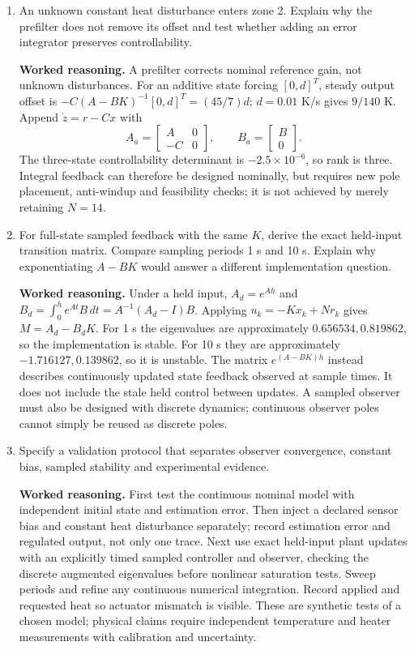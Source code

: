 \documentclass[10pt,a4paper]{article}
\newcommand{\answer}{\par\smallskip\textbf{Worked reasoning.} }
\begin{document}
\begin{enumerate}
\[\]
The poles are the union of feedback and observer poles. The observer must receive the applied actuator input. If it instead uses requested $u_*$ while the plant receives $u$, its error equation gains $B(u-u_*)$. Even with the correct input and homogeneous error dynamics, saturation makes the overall controller nonlinear; the linear separation principle does not prove global constrained performance.
\item An unknown constant heat disturbance enters zone 2. Explain why the prefilter does not remove its offset and test whether adding an error integrator preserves controllability.
\answer A prefilter corrects nominal reference gain, not unknown disturbances. For an additive state forcing $[0,d]^T$, steady output offset is $-C(A-BK)^{-1}[0,d]^T=(45/7)d$; $d=0.01$ K/s gives $9/140$ K. Append $\dot z=r-Cx$ with
\[
A_a=\begin{bmatrix}A&0\\-C&0\end{bmatrix},\qquad B_a=\begin{bmatrix}B\\0\end{bmatrix}.
\]
The three-state controllability determinant is $-2.5\times10^{-6}$, so rank is three. Integral feedback can therefore be designed nominally, but requires new pole placement, anti-windup and feasibility checks; it is not achieved by merely retaining $N=14$.
\item For full-state sampled feedback with the same $K$, derive the exact held-input transition matrix. Compare sampling periods 1 s and 10 s. Explain why exponentiating $A-BK$ would answer a different implementation question.
\answer Under a held input, $A_d=e^{Ah}$ and $B_d=\int_0^h e^{At}B\,dt=A^{-1}(A_d-I)B$. Applying $u_k=-Kx_k+Nr_k$ gives $M=A_d-B_dK$. For 1 s the eigenvalues are approximately $0.656534,0.819862$, so the implementation is stable. For 10 s they are approximately $-1.716127,0.139862$, so it is unstable. The matrix $e^{(A-BK)h}$ instead describes continuously updated state feedback observed at sample times. It does not include the stale held control between updates. A sampled observer must also be designed with discrete dynamics; continuous observer poles cannot simply be reused as discrete poles.
\item Specify a validation protocol that separates observer convergence, constant bias, sampled stability and experimental evidence.
\answer First test the continuous nominal model with independent initial state and estimation error. Then inject a declared sensor bias and constant heat disturbance separately; record estimation error and regulated output, not only one trace. Next use exact held-input plant updates with an explicitly timed sampled controller and observer, checking the discrete augmented eigenvalues before nonlinear saturation tests. Sweep periods and refine any continuous numerical integration. Record applied and requested heat so actuator mismatch is visible. These are synthetic tests of a chosen model; physical claims require independent temperature and heater measurements with calibration and uncertainty.
\end{enumerate}
\end{document}
